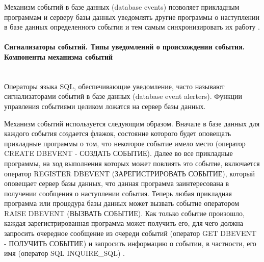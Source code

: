 Механизм событий в базе данных (database events) позволяет прикладным программам и серверу базы данных уведомлять другие программы о наступлении в базе данных определенного события и тем самым синхронизировать их работу \autocite{OSP}.

\paragraph{Сигнализаторы событий. Типы уведомлений о происхождении события. Компоненты механизма событий} ~\\

Операторы языка SQL, обеспечивающие уведомление, часто называют сигнализаторами событий в базе данных (database event alerters). Функции управления событиями целиком ложатся на сервер базы данных.

Механизм событий используется следующим образом. Вначале в базе данных для каждого события создается флажок, состояние которого будет оповещать прикладные программы о том, что некоторое событие имело место (оператор CREATE DBEVENT - СОЗДАТЬ СОБЫТИЕ). Далее во все прикладные программы, на ход выполнения которых может повлиять это событие, включается оператор REGISTER DBEVENT (ЗАРЕГИСТРИРОВАТЬ СОБЫТИЕ), который оповещает сервер базы данных, что данная программа заинтересована в получении сообщения о наступлении события. Теперь любая прикладная программа или процедура базы данных может вызвать событие оператором RAISE DBEVENT (ВЫЗВАТЬ СОБЫТИЕ). Как только событие произошло, каждая зарегистрированная программа может получить его, для чего должна запросить очередное сообщение из очереди событий (оператор GET DBEVENT - ПОЛУЧИТЬ СОБЫТИЕ) и запросить информацию о событии, в частности, его имя (оператор SQL INQUIRE\_SQL) \autocite{OSP}.
